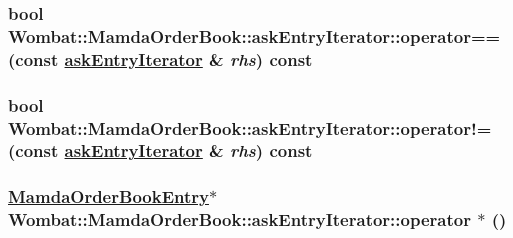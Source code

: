 \hypertarget{classWombat_1_1MamdaOrderBook_1_1askEntryIterator_37588e5ba65e55f8c8f72c07e8ebec7b}{
\subsubsection[operator==]{\setlength{\rightskip}{0pt plus 5cm}bool Wombat::Mamda\-Order\-Book::ask\-Entry\-Iterator::operator== (const \hyperlink{classWombat_1_1MamdaOrderBook_1_1askEntryIterator}{ask\-Entry\-Iterator} \& {\em rhs}) const}}
\label{classWombat_1_1MamdaOrderBook_1_1askEntryIterator_37588e5ba65e55f8c8f72c07e8ebec7b}


\hypertarget{classWombat_1_1MamdaOrderBook_1_1askEntryIterator_ff86ee5ad92b683c1c976cbb842149f8}{
\subsubsection[operator"!=]{\setlength{\rightskip}{0pt plus 5cm}bool Wombat::Mamda\-Order\-Book::ask\-Entry\-Iterator::operator!= (const \hyperlink{classWombat_1_1MamdaOrderBook_1_1askEntryIterator}{ask\-Entry\-Iterator} \& {\em rhs}) const}}
\label{classWombat_1_1MamdaOrderBook_1_1askEntryIterator_ff86ee5ad92b683c1c976cbb842149f8}


\hypertarget{classWombat_1_1MamdaOrderBook_1_1askEntryIterator_ede48a9aabc2ae2b7d68e1a12d197144}{
\subsubsection[operator $\ast$]{\setlength{\rightskip}{0pt plus 5cm}\hyperlink{classWombat_1_1MamdaOrderBookEntry}{Mamda\-Order\-Book\-Entry}$\ast$ Wombat::Mamda\-Order\-Book::ask\-Entry\-Iterator::operator $\ast$ ()}}
\label{classWombat_1_1MamdaOrderBook_1_1askEntryIterator_ede48a9aabc2ae2b7d68e1a12d197144}


